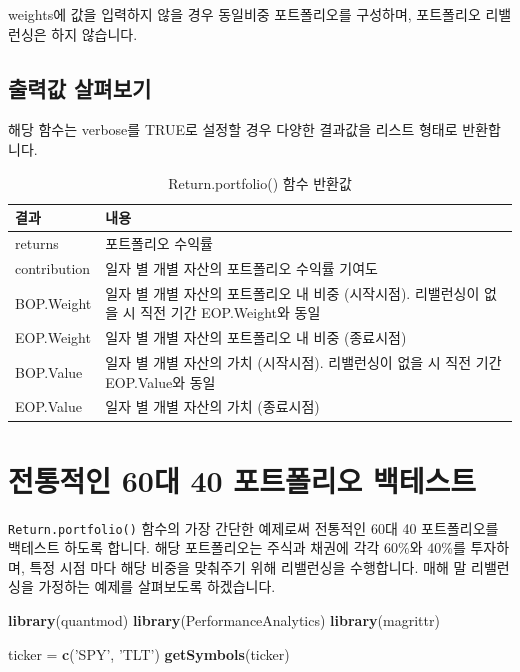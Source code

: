 \documentclass[12pt,]{book}
\newenvironment{Shaded}{\begin{snugshade}}{\end{snugshade}}
\newcommand{\KeywordTok}[1]{\textcolor[rgb]{0.13,0.29,0.53}{\textbf{#1}}}
\newcommand{\NormalTok}[1]{#1}
\newcommand{\StringTok}[1]{\textcolor[rgb]{0.31,0.60,0.02}{#1}}
\begin{document}
weights에 값을 입력하지 않을 경우 동일비중 포트폴리오를 구성하며, 포트폴리오 리밸런싱은 하지 않습니다.

\hypertarget{section-81}{%
\subsection{출력값 살펴보기}\label{section-81}}

해당 함수는 verbose를 TRUE로 설정할 경우 다양한 결과값을 리스트 형태로 반환합니다.

\begin{table}[!h]

\caption{\label{tab:unnamed-chunk-3}Return.portfolio() 함수 반환값}
\centering
\begin{tabular}{>{\centering\arraybackslash}p{2cm}>{\centering\arraybackslash}p{10cm}}
\toprule
결과 & 내용\\
\midrule
\rowcolor{gray!6}  returns & 포트폴리오 수익률\\
contribution & 일자 별 개별 자산의 포트폴리오 수익률 기여도\\
\rowcolor{gray!6}  BOP.Weight & 일자 별 개별 자산의 포트폴리오 내 비중 (시작시점). 리밸런싱이 없을 시 직전 기간 EOP.Weight와 동일\\
EOP.Weight & 일자 별 개별 자산의 포트폴리오 내 비중 (종료시점)\\
\rowcolor{gray!6}  BOP.Value & 일자 별 개별 자산의 가치 (시작시점). 리밸런싱이 없을 시 직전 기간 EOP.Value와 동일\\
\addlinespace
EOP.Value & 일자 별 개별 자산의 가치 (종료시점)\\
\bottomrule
\end{tabular}
\end{table}

\hypertarget{section-82}{%
\section{전통적인 60대 40 포트폴리오 백테스트}\label{section-82}}

\texttt{Return.portfolio()} 함수의 가장 간단한 예제로써 전통적인 60대 40 포트폴리오를 백테스트 하도록 합니다. 해당 포트폴리오는 주식과 채권에 각각 60\%와 40\%를 투자하며, 특정 시점 마다 해당 비중을 맞춰주기 위해 리밸런싱을 수행합니다. 매해 말 리밸런싱을 가정하는 예제를 살펴보도록 하겠습니다.

\begin{Shaded}
\begin{Highlighting}[]
\KeywordTok{library}\NormalTok{(quantmod)}
\KeywordTok{library}\NormalTok{(PerformanceAnalytics)}
\KeywordTok{library}\NormalTok{(magrittr)}

\NormalTok{ticker =}\StringTok{ }\KeywordTok{c}\NormalTok{(}\StringTok{'SPY'}\NormalTok{, }\StringTok{'TLT'}\NormalTok{)}
\KeywordTok{getSymbols}\NormalTok{(ticker)}
\end{Highlighting}
\end{Shaded}
\end{document}
